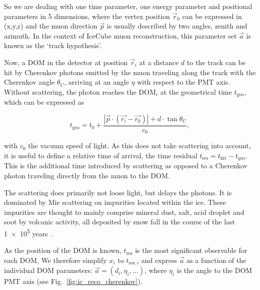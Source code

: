 So we are dealing with one time parameter, one energy parameter and positional parameters in 5 dimensions, where the vertex position $\vec{r}_0$ can be expressed in (x,y,z) and the muon direction $\vec{p}$ is usually described by two angles, zenith and azimuth. In the context of IceCube muon reconstruction, this parameter set $\vec{a}$ is known as the `track hypothesis'.

Now, a DOM in the detector at position $\vec{r}_i$ at a distance $d$ to the track can be hit by Cherenkov photons emitted by the muon traveling along the track with the Cherenkov angle $\theta_\text{C}$, arriving at an angle $\eta$ with respect to the PMT axis. Without scattering, the photon reaches the $\text{DOM}_i$ at the geometrical time $t_\text{geo}$, which can be expressed as

\begin{equation}
    t_\text{geo} = t_0 + \frac{|\vec{p}\cdot(\vec{r_i}-\vec{r_0})|+d\cdot \tan{\theta_\text{C}}}{c_0},
\end{equation}

with $c_0$ the vacuum speed of light. As this does not take scattering into account, it is useful to define a relative time of arrival, the time residual $t_\text{res} = t_\text{hit} - t_\text{geo}$. This is the additional time introduced by scattering as opposed to a Cherenkov photon traveling directly from the muon to the DOM\@.

The scattering does primarily not loose light, but delays the photons. It is dominated by Mie scattering on impurities located within the ice. These impurities are thought to mainly comprise mineral dust, salt, acid droplet and soot by volcanic activity, all deposited by snow fall in the course of the last \num{1e5} years~.

As the position of the DOM is known, $t_\text{res}$ is the most significant observable for each DOM,  We therefore simplify $x_i$ to $t_{\text{res},i}$ and express $\vec{a}$ as a function of the individual DOM parameters: $\vec{a}= (d_i,\eta_i,\ldots)$, where $\eta_i$ is the angle to the DOM PMT axis (see Fig.~\ref{fig:ic_reco_cherenkov}).


